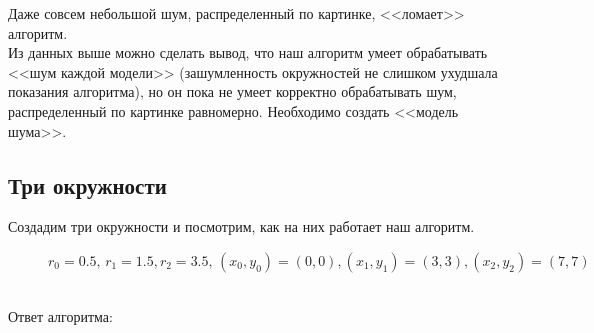 \documentclass[12pt,twoside]{article}
\begin{document}
Даже совсем небольшой шум, распределенный по картинке, <<ломает>> алгоритм.\\
Из данных выше можно сделать вывод, что наш алгоритм умеет обрабатывать <<шум каждой модели>> (зашумленность окружностей не слишком ухудшала показания алгоритма), но он пока не умеет корректно обрабатывать шум, распределенный по картинке равномерно. Необходимо создать <<модель шума>>. \\
\subsection{Три окружности}
Создадим три окружности и посмотрим, как на них работает наш алгоритм. \\
\begin{figure}[h]
\caption{$r_0 = 0.5, \, r_1 = 1.5, r_2 = 3.5, \, (x_0, y_0) = (0, 0), (x_1, y_1) = (3, 3), (x_2, y_2) = (7, 7)$}
\end{figure} \\
Ответ алгоритма: \\
\end{document}
